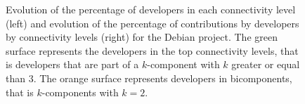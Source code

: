 \begin{figure}[H]
{}
\hspace{.05in}

\caption[Debian: Evolution of connectivity levels and contributions.]{Evolution of the percentage of developers in each connectivity level (left) and evolution of the percentage of contributions by developers by connectivity levels (right) for the Debian project. The green surface represents the developers in the top connectivity levels, that is developers that are part of a $k$-component with $k$ greater or equal than 3. The orange surface represents developers in bicomponents, that is $k$-components with $k=2$.}
\label{fig:evo}
\end{figure}

